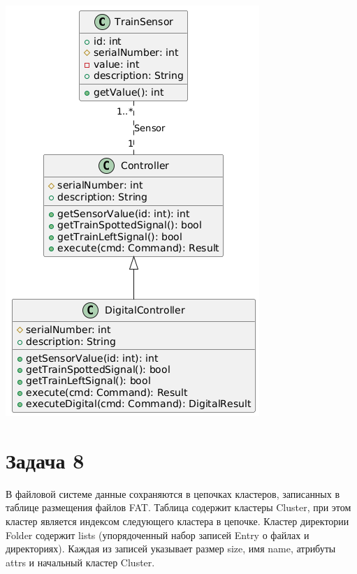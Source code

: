 \documentclass{article}
\begin{document}
\includegraphics[width=\textwidth]{7.png}

\section{Задача 8}
В файловой системе данные сохраняются в цепочках кластеров, записанных в таблице размещения файлов FAT. Таблица содержит кластеры Cluster, при этом кластер является индексом следующего кластера в цепочке. Кластер директории Folder содержит lists (упорядоченный набор записей Entry о файлах и директориях). Каждая из записей указывает размер size, имя name, атрибуты attrs и начальный кластер Cluster.
\end{document}
